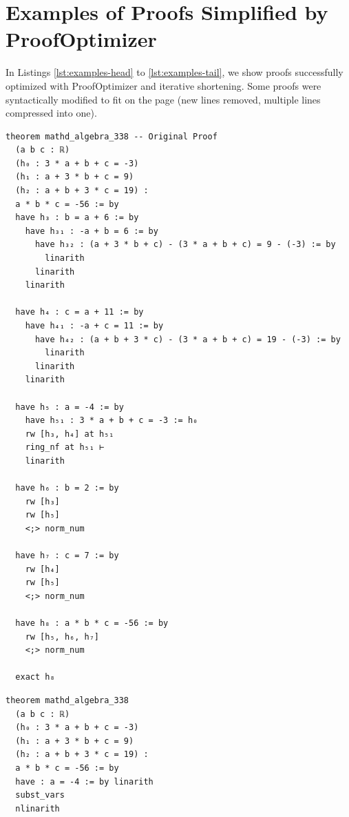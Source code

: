 \vfill


\newpage
\section{Examples of Proofs Simplified by ProofOptimizer}

In Listings \ref{lst:examples-head} to \ref{lst:examples-tail}, we show proofs successfully optimized with ProofOptimizer and iterative shortening. Some proofs were syntactically modified to fit on the page (new lines removed, multiple lines compressed into one).

\begin{tcolorbox}[colback=lightblue, boxrule=0pt, arc=5pt, outer arc=5pt, after skip=10pt plus 2pt]
\begin{minipage}[t]{0.48\textwidth}
\begin{lstlisting}[caption={Original Proof (Length 214)},label={lst:examples-head}, language=lean, breaklines=true, style=mystyle]
theorem mathd_algebra_338 -- Original Proof
  (a b c : ℝ)
  (h₀ : 3 * a + b + c = -3)
  (h₁ : a + 3 * b + c = 9)
  (h₂ : a + b + 3 * c = 19) :
  a * b * c = -56 := by
  have h₃ : b = a + 6 := by
    have h₃₁ : -a + b = 6 := by
      have h₃₂ : (a + 3 * b + c) - (3 * a + b + c) = 9 - (-3) := by
        linarith
      linarith
    linarith

  have h₄ : c = a + 11 := by
    have h₄₁ : -a + c = 11 := by
      have h₄₂ : (a + b + 3 * c) - (3 * a + b + c) = 19 - (-3) := by
        linarith
      linarith
    linarith

  have h₅ : a = -4 := by
    have h₅₁ : 3 * a + b + c = -3 := h₀
    rw [h₃, h₄] at h₅₁
    ring_nf at h₅₁ ⊢
    linarith

  have h₆ : b = 2 := by
    rw [h₃]
    rw [h₅]
    <;> norm_num

  have h₇ : c = 7 := by
    rw [h₄]
    rw [h₅]
    <;> norm_num

  have h₈ : a * b * c = -56 := by
    rw [h₅, h₆, h₇]
    <;> norm_num

  exact h₈
\end{lstlisting}
\end{minipage}\hfill
\begin{minipage}[t]{0.48\textwidth}
\begin{lstlisting}[caption={Simplified Proof (Length 11)}, language=lean, breaklines=true, style=mystyle]
theorem mathd_algebra_338
  (a b c : ℝ)
  (h₀ : 3 * a + b + c = -3)
  (h₁ : a + 3 * b + c = 9)
  (h₂ : a + b + 3 * c = 19) :
  a * b * c = -56 := by
  have : a = -4 := by linarith
  subst_vars
  nlinarith
\end{lstlisting}
\end{minipage}
\end{tcolorbox}

